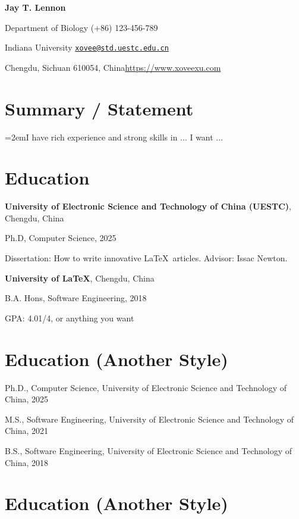 \documentclass{article}
\newcommand{\cvsection}[1]{\section*{\rmfamily#1}}
\begin{document}
\begin{center}
    \Huge{
    \rmfamily
    \textbf{Jay T. Lennon}}
\end{center}
\vspace{20pt}


\setlength{\parskip}{1pt}
\renewcommand{\arraystretch}{1.25}


\noindent Department of Biology 
\hfill (+86) 123-456-789

\noindent Indiana University
\hfill \href{mailto:xovee@std.uestc.edu.cn}{\texttt{xovee@std.uestc.edu.cn}}

\noindent Chengdu, Sichuan 610054, China\hfill \url{https://www.xoveexu.com}


\setlength{\parskip}{3pt}




\cvsection{Summary / Statement}
\indent

\hangindent=2emI have rich experience and strong skills in ... I want ...


\cvsection{Education}
\indent 

\textbf{University of Electronic Science and Technology of China (UESTC)}, Chengdu, China

\hspace{2em}Ph.D, Computer Science, 2025

\hspace{2em}Dissertation: How to write innovative \LaTeX~articles. Advisor: Issac Newton.

\textbf{University of LaTeX}, Chengdu, China

\hspace{2em}B.A. Hons, Software Engineering, 2018

\hspace{2em}GPA: 4.01/4, or anything you want


\cvsection{Education (Another Style)}
\indent 

Ph.D., Computer Science, University of Electronic Science and Technology of China, 2025

M.S., Software Engineering, University of Electronic Science and Technology of China, 2021

B.S., Software Engineering, University of Electronic Science and Technology of China, 2018


\cvsection{Education (Another Style)}
\indent 
\end{document}
